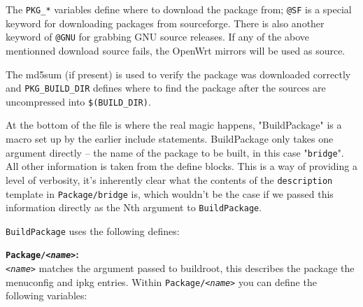 The \texttt{PKG\_*} variables define where to download the package from;
\texttt{@SF} is a special keyword for downloading packages from sourceforge. There is also
another keyword of \texttt{@GNU} for grabbing GNU source releases. If any of the above mentionned download source fails, the OpenWrt mirrors will be used as source.

The md5sum (if present) is used to verify the package was downloaded correctly and
\texttt{PKG\_BUILD\_DIR} defines where to find the package after the sources are
uncompressed into \texttt{\$(BUILD\_DIR)}.

At the bottom of the file is where the real magic happens, "BuildPackage" is a macro
set up by the earlier include statements. BuildPackage only takes one argument directly --
the name of the package to be built, in this case "\texttt{bridge}". All other information
is taken from the define blocks. This is a way of providing a level of verbosity, it's
inherently clear what the contents of the \texttt{description} template in
\texttt{Package/bridge} is, which wouldn't be the case if we passed this information
directly as the Nth argument to \texttt{BuildPackage}.

\texttt{BuildPackage} uses the following defines:

\textbf{\texttt{Package/\textit{<name>}}:} \\
    \texttt{\textit{<name>}} matches the argument passed to buildroot, this describes
    the package the menuconfig and ipkg entries. Within \texttt{Package/\textit{<name>}}
    you can define the following variables:

